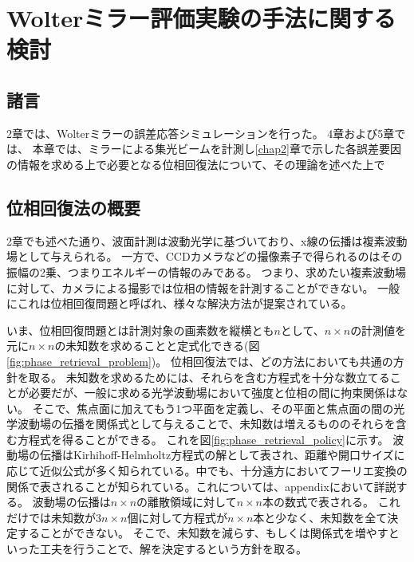 \chapter{Wolterミラー評価実験の手法に関する検討}
\thispagestyle{empty}
\label{chap3}
\graphicspath{{chap3/figure/}}
\minitoc

\newpage


\section{諸言}
\label{chap3_introduction}

2章では、Wolterミラーの誤差応答シミュレーションを行った。
4章および5章では、
本章では、ミラーによる集光ビームを計測し\ref{chap2}章で示した各誤差要因の情報を求める上で必要となる位相回復法について、その理論を述べた上で

\clearpage
\newpage


\section{位相回復法の概要}

2章でも述べた通り、波面計測は波動光学に基づいており、x線の伝播は複素波動場として与えられる。
一方で、CCDカメラなどの撮像素子で得られるのはその振幅の2乗、つまりエネルギーの情報のみである。
つまり、求めたい複素波動場に対して、カメラによる撮影では位相の情報を計測することができない。
一般にこれは位相回復問題と呼ばれ、様々な解決方法が提案されている。

いま、位相回復問題とは計測対象の画素数を縦横とも$n$として、$n \times n$の計測値を元に$n \times n$の未知数を求めることと定式化できる(図\ref{fig:phase_retrieval_problem})。
位相回復法では、どの方法においても共通の方針を取る。
未知数を求めるためには、それらを含む方程式を十分な数立てることが必要だが、一般に求める光学波動場において強度と位相の間に拘束関係はない。
そこで、焦点面に加えてもう1つ平面を定義し、その平面と焦点面の間の光学波動場の伝播を関係式として与えることで、未知数は増えるもののそれらを含む方程式を得ることができる。
これを図\ref{fig:phase_retrieval_policy}に示す。
波動場の伝播はKirhihoff-Helmholtz方程式の解として表され、距離や開口サイズに応じて近似公式が多く知られている。中でも、十分遠方においてフーリエ変換の関係で表されることが知られている。これについては、appendixにおいて詳説する。
波動場の伝播は$n \times n$の離散領域に対して$n \times n$本の数式で表される。
これだけでは未知数が$3n \times n$個に対して方程式が$n \times n$本と少なく、未知数を全て決定することができない。
そこで、未知数を減らす、もしくは関係式を増やすといった工夫を行うことで、解を決定するという方針を取る。

